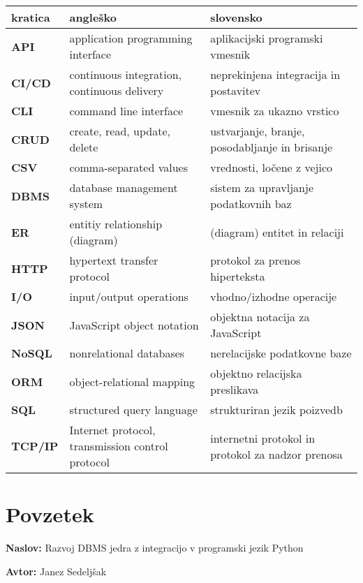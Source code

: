 \documentclass[a4paper,12pt,openright]{book}
\newcommand{\ttitle}{Razvoj DBMS jedra z integracijo v programski jezik Python}
\newcommand{\tauthor}{Janez Sedeljšak}
\newcommand{\clearemptydoublepage}{\newpage{\pagestyle{empty}\cleardoublepage}}
\begin{document}
\noindent\begin{tabular}{p{}|p{}|p{}}
  {\bf kratica} & {\bf angleško}                              & {\bf slovensko} \\ \hline
  {\bf API} & application programming interface & aplikacijski programski vmesnik \\
  {\bf CI/CD} & continuous integration, continuous delivery & neprekinjena integracija in postavitev \\
  {\bf CLI} & command line interface & vmesnik za ukazno vrstico \\
  {\bf CRUD} & create, read, update, delete & ustvarjanje, branje, posodabljanje in brisanje \\
  {\bf CSV} & comma-separated values & vrednosti, ločene z vejico \\
  {\bf DBMS} & database management system & sistem za upravljanje podatkovnih baz \\
  {\bf ER} & entitiy relationship (diagram) & (diagram) entitet in relaciji \\
  {\bf HTTP} & hypertext transfer protocol & protokol za prenos hiperteksta \\
  {\bf I/O} & input/output operations & vhodno/izhodne operacije \\
  {\bf JSON} & JavaScript object notation & objektna notacija za JavaScript \\
  {\bf NoSQL} & nonrelational databases & nerelacijske podatkovne baze \\
  {\bf ORM} & object-relational mapping & objektno relacijska preslikava \\
  {\bf SQL} & structured query language & strukturiran jezik poizvedb \\
  {\bf TCP/IP} & Internet protocol, transmission control protocol & internetni protokol in protokol za nadzor prenosa \\
\end{tabular}


\clearemptydoublepage

{}
\chapter*{Povzetek}

\noindent\textbf{Naslov:} \ttitle
\bigskip

\noindent\textbf{Avtor:} \tauthor
\bigskip
\end{document}
